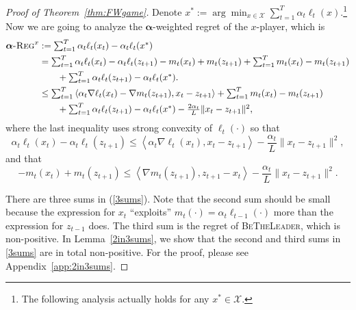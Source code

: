 \documentclass[final,12pt]{colt2018} %
\def\balpha{\boldsymbol{\alpha}}
\def\BTL{\textsc{BeTheLeader}\xspace}
\newcommand{\lr}[2]{\left\langle#1,#2\right\rangle}
\newcommand{\regret}[1]{\balpha\textsc{-Reg}^{#1}}
\newcommand{\XX}{\mathcal{X}}
\begin{document}
\begin{proof}[Proof of Theorem~\ref{thm:FWgame}]
	Denote $x^{*} := \arg\min_{x \in \XX} \sum_{t=1}^T  \alpha_t  \ell_t(x)$.\footnote{The following analysis actually holds for any $x^{*} \in \XX$.}
	Now we are going to analyze the $\balpha$-weighted regret of the $x$-player, which is 
	\begin{equation}
	\begin{aligned}
	\regret{x} & \textstyle := \sum_{t=1}^{T} \alpha_t \ell_t(x_t) - \alpha_t \ell_t(x^*)
	\\ & \textstyle = \sum_{t=1}^{T} \alpha_t \ell_t(x_t)  - \alpha_t \ell_t(z_{t+1}) - m_t(x_t) + m_t(z_{t+1})
	+ \sum_{t=1}^{T} m_t(x_t) - m_t(z_{t+1})
	\\ & \textstyle \quad \quad + \sum_{t=1}^T \alpha_t \ell_t(z_{t+1}) - \alpha_t \ell_t(x^*).
	\\ & \textstyle\leq \sum_{t=1}^{T} \lr{\alpha_t \nabla \ell_t(x_t) - \nabla m_t(z_{t+1}) }{x_t - z_{t+1}}
	+ \sum_{t=1}^{T} m_t(x_t) - m_t(z_{t+1})
	\\& \textstyle \quad \quad  + \sum_{t=1}^T \alpha_t \ell_t(z_{t+1}) - \alpha_t \ell_t(x^*) - \frac{2 \alpha_t}{L} \| x_t - z_{t+1}\|^2,  \label{3sums}
	\end{aligned}
	\end{equation}
	where the last inequality uses strong convexity of $\ell_{t}(\cdot)$ so that 
	\begin{equation}
\textstyle	\alpha_t \ell_t(x_t)  - \alpha_t \ell_t(z_{t+1}) \leq \lr{\alpha_t \nabla \ell_t(x_t)}{x_t- z_{t+1}} - \frac{\alpha_t}{L} \| x_t - z_{t+1}\|^2,
	\end{equation}
	and that 
	\begin{equation}
\textstyle	- m_t(x_t) + m_t(z_{t+1})
	\leq \lr{\nabla m_t(z_{t+1})}{z_{t+1}-x_t} - \frac{\alpha_t}{L} \| x_t - z_{t+1}\|^2.
	\end{equation}
	
	There are three sums in (\ref{3sums}). 
	Note that the second sum should be small because the expression for $x_t$ ``exploits'' $m_{t}(\cdot) = \alpha_t \ell_{t-1}(\cdot)$ more than the expression for $z_{t-1}$ does. The third sum is the regret of \BTL, which is non-positive. 
	In Lemma~\ref{2in3sums}, we show that the second and third sums in \cref{3sums} are in total non-positive. For the proof, please see Appendix~\ref{app:2in3sums}. 
	

\end{proof}
\end{document}

